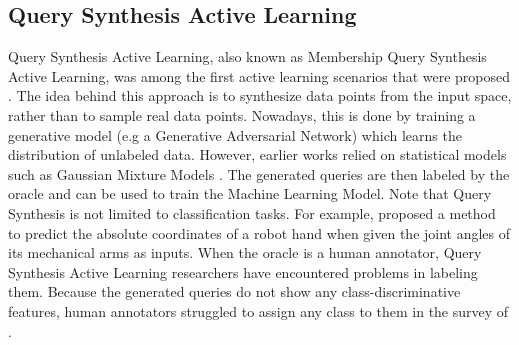 \subsection{Query Synthesis Active Learning}
\label{sec:QuerySynthesisActiveLearning}
Query Synthesis Active Learning, also known as Membership Query Synthesis Active Learning, was among the first active learning scenarios
that were proposed \cite{angluin1988queries}. The idea behind this approach is to synthesize data points from the input space, rather than
to sample real data points. Nowadays, this is done by training a generative model (e.g a Generative Adversarial Network) \cite{zhu2017generative}
which learns the distribution of unlabeled data. However, earlier works relied on statistical models such as Gaussian Mixture Models 
\cite{cohn1996active}. The generated queries are then labeled by the oracle and can be used to train the Machine Learning Model. Note that
Query Synthesis is not limited to classification tasks. For example, \cite{cohn1996active} proposed a method to predict the absolute coordinates
of a robot hand when given the joint angles of its mechanical arms as inputs. When the oracle is a human annotator, Query Synthesis Active Learning
researchers have encountered problems in labeling them. Because the generated queries do not show any class-discriminative features, human annotators
struggled to assign any class to them in the survey of \cite{baum1992query}.


